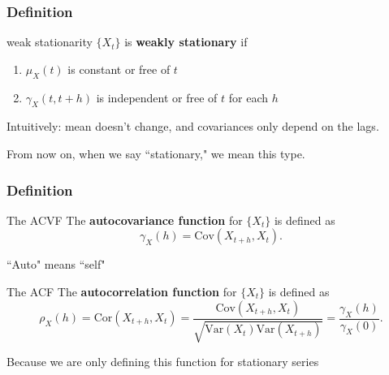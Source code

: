 \documentclass{beamer}
\begin{document}
\begin{frame}
\frametitle{Definition}

\begin{block}{weak stationarity}
$\{X_t\}$ is {\bf weakly stationary} if 
\begin{enumerate}
\item $\mu_X(t)$ is constant or free of $t$
\item $\gamma_X(t,t+h)$ is independent or free of $t$ for each $h$ 
\end{enumerate}
\end{block}
Intuitively: mean doesn't change, and covariances only depend on the lags.
\newline

From now on, when we say ``stationary," we mean this type.

\end{frame}


\begin{frame}
\frametitle{Definition}

\begin{block}{The ACVF}
The {\bf autocovariance function} for $\{X_t\}$ is defined as
\[
\gamma_X(h) = \text{Cov}(X_{t+h},X_t).
\]
\end{block}
``Auto" means ``self"
\newline

\begin{block}{The ACF}
The {\bf autocorrelation function} for $\{X_t\}$ is defined as
\[
\rho_X(h) = \text{Cor}(X_{t+h},X_t) = \frac{ \text{Cov}(X_{t+h},X_t) }{ \sqrt{\text{Var}(X_t)\text{Var}(X_{t+h})}} = \frac{\gamma_X(h)}{\gamma_X(0)}.
\]
\end{block}
Because we are only defining this function for stationary series
\end{frame}

\end{document}
